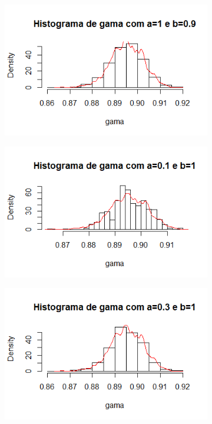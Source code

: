 \documentclass{article}
\begin{document}
\begin{figure}[H]
\begin{subfigure}[h]{0.6\textwidth}
 					 \end{subfigure}
 					 \begin{subfigure}[h]{0.6\textwidth}
   						 \includegraphics[width=\textwidth]{a1-0b0-9}
 					 \end{subfigure}
 					 \begin{subfigure}[h]{0.6\textwidth}
   						 \includegraphics[width=\textwidth]{a0-1b1-0}
 					 \end{subfigure}
 					 \begin{subfigure}[h]{0.6\textwidth}
   						 \includegraphics[width=\textwidth]{a0-3b1-0}
 					 \end{subfigure}
				\end{figure}
\end{document}
